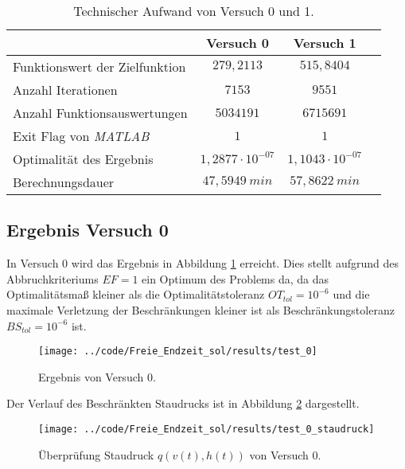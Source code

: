 \begin{table}[H]
    \centering
    \caption{Technischer Aufwand von Versuch 0 und 1.}\label{tab:Versuch_TA}
    \begin{tabularx}{.9\textwidth}{Zccc}
        \toprule
         & \textbf{Versuch 0} & \textbf{Versuch 1} \\
        \midrule
        Funktionswert der Zielfunktion & $279,2113$ & $515,8404$ \\
        Anzahl Iterationen & $7153$ & $9551$ \\
        Anzahl Funktionsauswertungen & $5034191$ & $6715691$ \\
        Exit Flag von \textit{MATLAB} & $1$ & $1$ \\
        Optimalität des Ergebnis & $1,2877 \cdot 10^{-07}$ & $1,1043 \cdot 10^{-07}$ \\
        Berechnungsdauer & $47,5949 \ min$ & $57,8622 \ min$ \\
        \bottomrule
    \end{tabularx}
\end{table}




\subsection{Ergebnis Versuch 0}\label{kap:Versuch0_OptTf}
In Versuch 0 wird das Ergebnis in Abbildung \ref{img:test_0_OptTf} erreicht. Dies stellt aufgrund des Abbruchkriteriums $EF = 1$ ein Optimum des Problems da, da das Optimalitätsmaß kleiner als die Optimalitätstoleranz $OT_{tol} = 10^{-6}$ und die maximale Verletzung der Beschränkungen kleiner ist als Beschränkungstoleranz $BS_{tol} = 10^{-6}$ ist.
\begin{figure}[H]
\begin{center}
\texttt{[image: ../code/Freie\_Endzeit\_sol/results/test\_0]}
\caption{Ergebnis von Versuch 0.}\label{img:test_0_OptTf}
\end{center}
\end{figure}
Der Verlauf des Beschränkten Staudrucks ist in Abbildung \ref{img:test_0_staudruck_OptTf} dargestellt.
\begin{figure}[H]
\begin{center}
\texttt{[image: ../code/Freie\_Endzeit\_sol/results/test\_0\_staudruck]}
\caption{Überprüfung Staudruck $q(v(t),h(t))$ von Versuch 0.} \label{img:test_0_staudruck_OptTf}
\end{center}
\end{figure}





